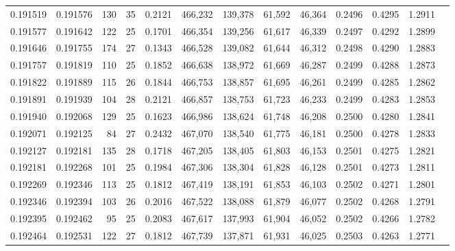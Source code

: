 \begin{tabular}{rrrrrrrrrrrrr}
0.191519 & 0.191576 & 130 &  35 &                                     0.2121 & 466,232 & 139,378 &  61,592 &  46,364 & 0.2496 & 0.4295 & 1.2911 \\
0.191577 & 0.191642 & 122 &  25 &                                     0.1701 & 466,354 & 139,256 &  61,617 &  46,339 & 0.2497 & 0.4292 & 1.2899 \\
0.191646 & 0.191755 & 174 &  27 &                                     0.1343 & 466,528 & 139,082 &  61,644 &  46,312 & 0.2498 & 0.4290 & 1.2883 \\
0.191757 & 0.191819 & 110 &  25 &                                     0.1852 & 466,638 & 138,972 &  61,669 &  46,287 & 0.2499 & 0.4288 & 1.2873 \\
0.191822 & 0.191889 & 115 &  26 &                                     0.1844 & 466,753 & 138,857 &  61,695 &  46,261 & 0.2499 & 0.4285 & 1.2862 \\
0.191891 & 0.191939 & 104 &  28 &                                     0.2121 & 466,857 & 138,753 &  61,723 &  46,233 & 0.2499 & 0.4283 & 1.2853 \\
0.191940 & 0.192068 & 129 &  25 &                                     0.1623 & 466,986 & 138,624 &  61,748 &  46,208 & 0.2500 & 0.4280 & 1.2841 \\
0.192071 & 0.192125 &  84 &  27 &                                     0.2432 & 467,070 & 138,540 &  61,775 &  46,181 & 0.2500 & 0.4278 & 1.2833 \\
0.192127 & 0.192181 & 135 &  28 &                                     0.1718 & 467,205 & 138,405 &  61,803 &  46,153 & 0.2501 & 0.4275 & 1.2821 \\
0.192181 & 0.192268 & 101 &  25 &                                     0.1984 & 467,306 & 138,304 &  61,828 &  46,128 & 0.2501 & 0.4273 & 1.2811 \\
0.192269 & 0.192346 & 113 &  25 &                                     0.1812 & 467,419 & 138,191 &  61,853 &  46,103 & 0.2502 & 0.4271 & 1.2801 \\
0.192346 & 0.192394 & 103 &  26 &                                     0.2016 & 467,522 & 138,088 &  61,879 &  46,077 & 0.2502 & 0.4268 & 1.2791 \\
0.192395 & 0.192462 &  95 &  25 &                                     0.2083 & 467,617 & 137,993 &  61,904 &  46,052 & 0.2502 & 0.4266 & 1.2782 \\
0.192464 & 0.192531 & 122 &  27 &                                     0.1812 & 467,739 & 137,871 &  61,931 &  46,025 & 0.2503 & 0.4263 & 1.2771 \\

\end{tabular}
